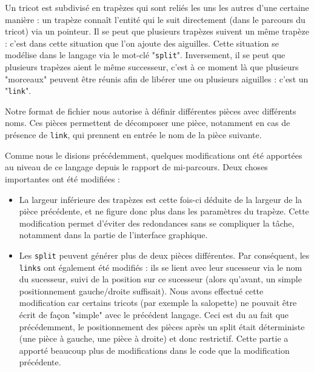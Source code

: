 \documentclass{article}
\begin{document}
Un tricot est subdivisé en trapèzes qui sont reliés les uns les autres
d'une certaine manière : un trapèze connaît l'entité qui le suit
directement (dans le parcours du tricot) via un pointeur. Il se peut
que plusieurs trapèzes suivent un même trapèze : c'est dans cette
situation que l'on ajoute des aiguilles. Cette situation se modélise
dans le langage via le mot-clé "\texttt{split}".  Inversement, il se
peut que plusieurs trapèzes aient le même successeur, c'est à ce
moment là que plusieurs "morceaux" peuvent être réunis afin de libérer
une ou plusieurs aiguilles : c'est un "\texttt{link}".

Notre format de fichier nous autorise à définir différentes pièces
avec différents noms. Ces pièces permettent de décomposer une pièce,
notamment en cas de présence de \texttt{link}, qui prennent en entrée
le nom de la pièce suivante.


Comme nous le disions précédemment, quelques modifications ont été
apportées au niveau de ce langage depuis le rapport de
mi-parcours. Deux choses importantes ont été modifiées :
\begin{itemize}
	\item La largeur inférieure des trapèzes est cette fois-ci
          déduite de la largeur de la pièce précédente, et ne figure
          donc plus dans les paramètres du trapèze. Cette modification
          permet d'éviter des redondances sans se compliquer la tâche,
          notamment dans la partie de l'interface graphique.
	\item Les \texttt{split} peuvent générer plus de deux pièces
          différentes. Par conséquent, les \texttt{links} ont
          également été modifiés : ils se lient avec leur sucesseur
          via le nom du sucesseur, suivi de la position sur ce
          sucesseur (alors qu'avant, un simple positionnement
          gauche/droite suffisait). Nous avons effectué cette
          modification car certains tricots (par exemple la salopette)
          ne pouvait être écrit de façon "simple" avec le précédent
          langage. Ceci est du au fait que précédemment, le
          positionnement des pièces après un split était déterministe
          (une pièce à gauche, une pièce à droite) et donc
          restrictif. Cette partie a apporté beaucoup plus de
          modifications dans le code que la modification précédente.
\end{itemize}
\end{document}
